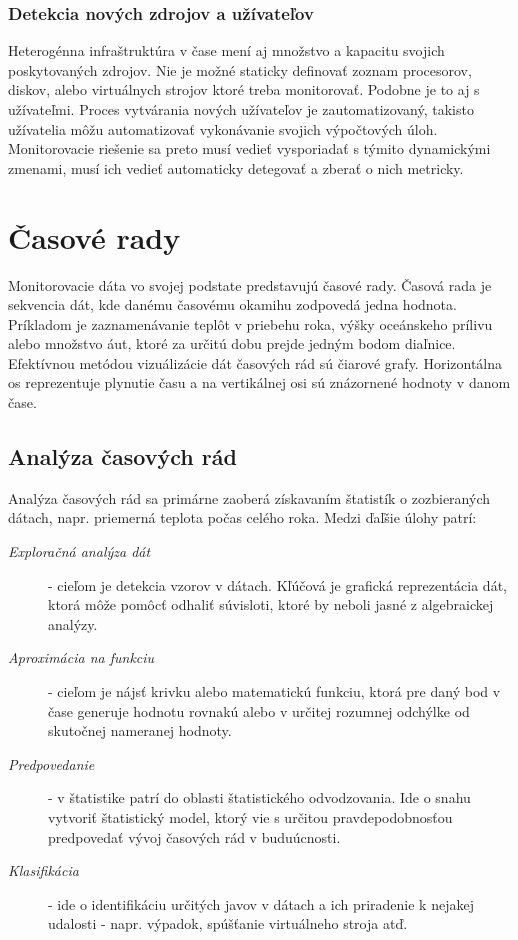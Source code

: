 \documentclass[printed,11pt,twoside,color,cover,table]{fithesis3}
\begin{document}
\subsubsection{Detekcia nových zdrojov a užívateľov}
Heterogénna infraštruktúra v čase mení aj množstvo a kapacitu svojich poskytovaných zdrojov. Nie je možné staticky definovať zoznam procesorov, diskov, alebo virtuálnych strojov ktoré treba monitorovať. 
Podobne je to aj s užívateľmi. Proces vytvárania nových užívateľov je zautomatizovaný, takisto užívatelia môžu automatizovať vykonávanie svojich výpočtových úloh. Monitorovacie riešenie sa preto musí 
vedieť vysporiadať s týmito dynamickými zmenami, musí ich vedieť automaticky detegovať a zberať o nich metricky.

\section{Časové rady}
Monitorovacie dáta vo svojej podstate predstavujú časové rady.
Časová rada je sekvencia dát, kde danému časovému okamihu zodpovedá jedna hodnota. Príkladom je zaznamenávanie teplôt v priebehu roka, výšky oceánskeho prílivu alebo množstvo áut, ktoré za určitú dobu
prejde jedným bodom diaľnice. Efektívnou metódou vizuálizácie dát časových rád sú čiarové grafy. Horizontálna os reprezentuje plynutie času a na vertikálnej osi sú znázornené hodnoty v danom čase.

\subsection{Analýza časových rád}
Analýza časových rád sa primárne zaoberá získavaním štatistík o zozbieraných dátach, napr. priemerná teplota počas celého roka. Medzi ďaľšie úlohy patrí:
\begin{description}
\item[\emph{Exploračná analýza dát}] - cieľom je detekcia vzorov v dátach. Kľúčová je grafická reprezentácia dát, ktorá môže pomôcť odhaliť súvisloti, ktoré by neboli jasné z algebraickej analýzy.\cite{eda}
\item[\emph{Aproximácia na funkciu}] - cieľom je nájsť krivku alebo matematickú funkciu, ktorá pre daný bod v čase generuje hodnotu rovnakú alebo v určitej rozumnej odchýlke od skutočnej nameranej hodnoty.
\item[\emph{Predpovedanie}] - v štatistike patrí do oblasti štatistického odvodzovania. Ide o snahu vytvoriť štatistický model, ktorý vie s určitou pravdepodobnosťou predpovedať vývoj časových rád
v buduúcnosti.
\item[\emph{Klasifikácia}] - ide o identifikáciu určitých javov v dátach a ich priradenie k nejakej udalosti - napr. výpadok, spúšťanie virtuálneho stroja atď.                               
\end{description}
\end{document}
